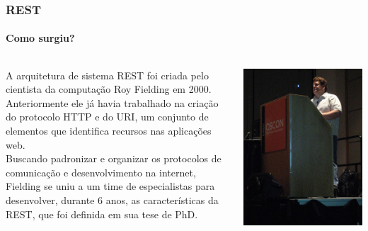 \documentclass[
	10pt, %
	t, %
]{beamer}
\begin{document}
\begin{frame}
	\frametitle{REST}
	\framesubtitle<1>{Como surgiu?}

	\begin{columns}[c]
		\begin{column}{0.8\textwidth} %
			A arquitetura de sistema REST foi criada pelo cientista da computação \alert{Roy Fielding em 2000}. \\ \bigskip
			Anteriormente ele já havia trabalhado na criação do \alert{protocolo HTTP e do URI}, um conjunto de elementos que identifica recursos nas aplicações web.  \\ \bigskip
			Buscando padronizar e organizar os protocolos de comunicação e desenvolvimento na internet, Fielding se uniu a um time de especialistas para desenvolver, \alert{durante 6 anos}, as características da \alert{REST}, que foi definida em sua tese de PhD.
		\end{column}

		\begin{column}{0.2\textwidth} %
			\includegraphics[width=0.9\linewidth]{roy.jpg}
		\end{column}
	\end{columns}

\end{frame}
\end{document}
